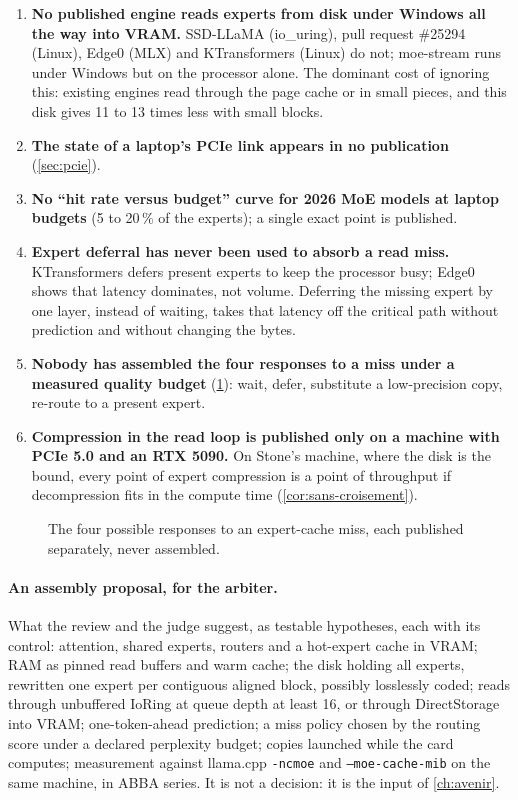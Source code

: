 \begin{enumerate}
\item \textbf{No published engine reads experts from disk under Windows all the way into VRAM.} SSD-LLaMA (io\_uring), pull request \#25294 (Linux), Edge0 (MLX) and KTransformers (Linux) do not; moe-stream runs under Windows but on the processor alone. The dominant cost of ignoring this: existing engines read through the page cache or in small pieces, and this disk gives 11 to 13 times less with small blocks.
\item \textbf{The state of a laptop's PCIe link appears in no publication} (\cref{sec:pcie}).
\item \textbf{No \enquote{hit rate versus budget} curve for 2026 MoE models at laptop budgets} (5 to 20\,\% of the experts); a single exact point is published.
\item \textbf{Expert deferral has never been used to absorb a read miss.} KTransformers defers present experts to keep the processor busy; Edge0 shows that latency dominates, not volume. Deferring the missing expert by one layer, instead of waiting, takes that latency off the critical path without prediction and without changing the bytes.
\item \textbf{Nobody has assembled the four responses to a miss under a measured quality budget} (\cref{fig:defaut}): wait, defer, substitute a low-precision copy, re-route to a present expert.
\item \textbf{Compression in the read loop is published only on a machine with PCIe 5.0 and an RTX 5090.} On Stone's machine, where the disk is the bound, every point of expert compression is a point of throughput if decompression fits in the compute time (\cref{cor:sans-croisement}).
\end{enumerate}

\begin{figure}[ht]
\centering
\SchemaDefaut
\caption[The four responses to a cache miss]{The four possible responses to an expert-cache miss, each published separately, never assembled.}
\label{fig:defaut}
\end{figure}

\paragraph{An assembly proposal, for the arbiter.} What the review and the judge suggest, as testable hypotheses, each with its control: attention, shared experts, routers and a hot-expert cache in VRAM; RAM as pinned read buffers and warm cache; the disk holding all experts, rewritten one expert per contiguous aligned block, possibly losslessly coded; reads through unbuffered IoRing at queue depth at least 16, or through DirectStorage into VRAM; one-token-ahead prediction; a miss policy chosen by the routing score under a declared perplexity budget; copies launched while the card computes; measurement against llama.cpp \texttt{-ncmoe} and \texttt{--moe-cache-mib} on the same machine, in ABBA series. It is not a decision: it is the input of \cref{ch:avenir}.

